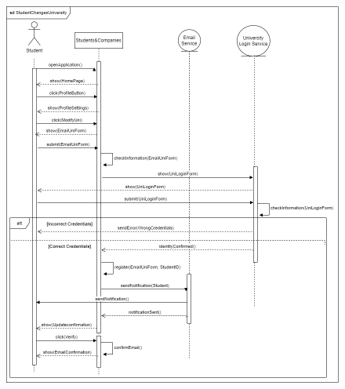 \documentclass{article}
\begin{document}
\begin{figure}[H]
    \centering
    \includegraphics[scale = 0.45]{figures/UseCasesSD/StudentChangesUniversitySD.drawio (1).png}
\end{figure}
\end{document}
